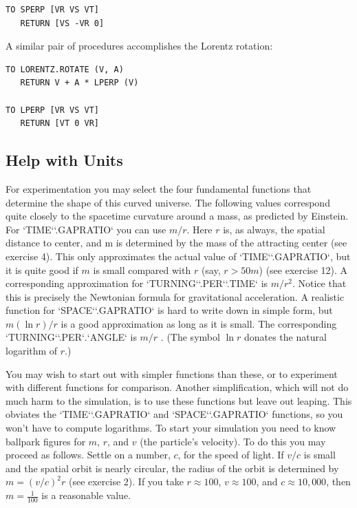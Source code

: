 \documentclass{book}
\begin{document}
\begin{verbatim}
TO SPERP [VR VS VT]
   RETURN [VS -VR 0]
\end{verbatim}
A similar pair of procedures accomplishes the Lorentz rotation:

\begin{verbatim}
TO LORENTZ.ROTATE (V, A)
   RETURN V + A * LPERP (V)

TO LPERP [VR VS VT]
   RETURN [VT 0 VR]
\end{verbatim}
\subsection{Help with Units}

For experimentation you may select the four fundamental functions that
determine the shape of this curved universe. The following values correspond quite closely to the spacetime curvature around a mass, as
predicted by Einstein. For \textsc{`TIME`}\textsc{`.GAPRATIO`} you can use $m / r$. Here $r$
is, as always, the spatial distance to center, and m is determined by the
mass of the attracting center (see exercise 4). This only approximates
the actual value of \textsc{`TIME`}\textsc{`.GAPRATIO`}, but it is quite good if $m$ is small
compared with $r$ (say, $r > 50m$) (see exercise 12). A corresponding approximation for \textsc{`TURNING`}\textsc{`.PER`}\textsc{`.TIME`} is $m / r^2$. Notice that this is precisely
the Newtonian formula for gravitational acceleration. A realistic function for \textsc{`SPACE`}\textsc{`.GAPRATIO`} is hard to write down in simple form, but
$m(\ln r) / r$ is a good approximation as long as it is small. The corresponding \textsc{`TURNING`}\textsc{`.PER`}.\textsc{`ANGLE`} is $m / r$ . (The symbol $\ln r$ donates the natural
logarithm of $r$.)

You may wish to start out with simpler functions than these, or to experiment with different functions for comparison. Another simplification,
which will not do much harm to the simulation, is to use these functions but leave out leaping. This obviates the \textsc{`TIME`}\textsc{`.GAPRATIO`} and
\textsc{`SPACE`}\textsc{`.GAPRATIO`} functions, so you won't have to compute logarithms.
To start your simulation you need to know ballpark figures for $m$, $r$,
and $v$ (the particle's velocity). To do this you may proceed as follows.
Settle on a number, $c$, for the speed of light. If $v / c$ is small and the
spatial orbit is nearly circular, the radius of the orbit is determined by
$m = (v/c)^2r$ (see exercise 2). If you take $r \approx 100$, $v \approx 100$, and $c \approx 10,000$, then $m = \frac {1} {100}$ is a reasonable value.
\end{document}
